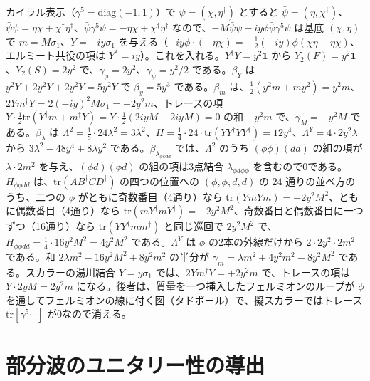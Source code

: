 \documentclass[a4paper,10pt]{ltjsarticle}
\begin{document}
カイラル表示（$\gamma^5=\mathrm{diag}(-1,1)$）で $\psi=(\chi,\eta^\dagger)$ とすると $\bar\psi=(\eta,\chi^\dagger)$、$\bar\psi\psi=\eta\chi+\chi^\dagger\eta^\dagger$、$\bar\psi\gamma^5\psi=-\eta\chi+\chi^\dagger\eta^\dagger$ なので、$-M\bar\psi\psi-iy\phi\bar\psi\gamma^5\psi$ は基底 $(\chi,\eta)$ で $m=M\sigma_1$、$Y=-iy\sigma_1$ を与える（$-iy\phi\cdot(-\eta\chi)=-\frac12(-iy)\phi(\chi\eta+\eta\chi)$、エルミート共役の項は $Y^*=iy$）。これを入れる。$Y^\dagger Y=y^2\mathbf 1$ から $Y_2(F)=y^2\mathbf 1$、$Y_2(S)=2y^2$ で、$\gamma_\phi=2y^2$、$\gamma_\psi=y^2/2$ である。$\beta_Y$ は $y^2Y+2y^2Y+2y^2Y=5y^2Y$ で $\beta_y=5y^3$ である。$\beta_m$ は、$\frac12(y^2m+my^2)=y^2m$、$2Ym^\dagger Y=2(-iy)^2M\sigma_1=-2y^2m$、トレースの項 $Y\cdot\frac12\mathrm{tr}(Y^\dagger m+m^\dagger Y)=Y\cdot\frac12(2iyM-2iyM)=0$ の和 $-y^2m$ で、$\gamma_M=-y^2M$ である。$\beta_\lambda$ は $\Lambda^2=\frac18\cdot24\lambda^2=3\lambda^2$、$H=\frac14\cdot24\cdot\mathrm{tr}(Y Y^\dagger YY^\dagger)=12y^4$、$\Lambda^Y=4\cdot2y^2\lambda$ から $3\lambda^2-48y^4+8\lambda y^2$ である。$\beta_{\lambda_{\phi\phi dd}}$ では、$\Lambda^2$ のうち $(\phi\phi)(dd)$ の組の項が $\lambda\cdot2m^2$ を与え、$(\phi d)(\phi d)$ の組の項は3点結合 $\lambda_{\phi d\phi\phi}$ を含むので0である。$H_{\phi\phi dd}$ は、$\mathrm{tr}(AB^\dagger CD^\dagger)$ の四つの位置への $(\phi,\phi,d,d)$ の $24$ 通りの並べ方のうち、二つの $\phi$ がともに奇数番目（4通り）なら $\mathrm{tr}(YmYm)=-2y^2M^2$、ともに偶数番目（4通り）なら $\mathrm{tr}(mY^\dagger mY^\dagger)=-2y^2M^2$、奇数番目と偶数番目に一つずつ（16通り）なら $\mathrm{tr}(YY^\dagger mm^\dagger)$ と同じ巡回で $2y^2M^2$ で、$H_{\phi\phi dd}=\frac14\cdot16y^2M^2=4y^2M^2$ である。$\Lambda^Y$ は $\phi$ の2本の外線だけから $2\cdot2y^2\cdot2m^2$ である。和 $2\lambda m^2-16y^2M^2+8y^2m^2$ の半分が $\gamma_m=\lambda m^2+4y^2m^2-8y^2M^2$ である。スカラーの湯川結合 $Y=y\sigma_1$ では、$2Ym^\dagger Y=+2y^2m$ で、トレースの項は $Y\cdot2yM=2y^2m$ になる。後者は、質量を一つ挿入したフェルミオンのループが $\phi$ を通してフェルミオンの線に付く図（タドポール）で、擬スカラーではトレース $\mathrm{tr}[\gamma^5\cdots]$ が0なので消える。

\section{部分波のユニタリー性の導出}\label{app:pw}
\end{document}
